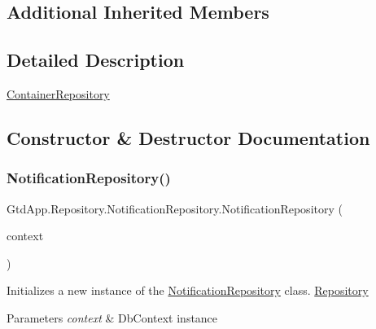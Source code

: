 \subsection*{Additional Inherited Members}


\subsection{Detailed Description}
\mbox{\hyperlink{class_gtd_app_1_1_repository_1_1_container_repository}{Container\+Repository}} 



\subsection{Constructor \& Destructor Documentation}
\mbox{\label{class_gtd_app_1_1_repository_1_1_notification_repository_a39cd06a390d0be8e1624dd4335e675ba}} 
\subsubsection{\texorpdfstring{Notification\+Repository()}{NotificationRepository()}}
{\footnotesize\ttfamily Gtd\+App.\+Repository.\+Notification\+Repository.\+Notification\+Repository (\begin{DoxyParamCaption}\item[{\mbox{\hyperlink{class_gtd_app_1_1_data_1_1_gtd_entity_data_model}{Gtd\+Entity\+Data\+Model}}}]{context }\end{DoxyParamCaption})}



Initializes a new instance of the \mbox{\hyperlink{class_gtd_app_1_1_repository_1_1_notification_repository}{Notification\+Repository}} class. \mbox{\hyperlink{class_gtd_app_1_1_repository_1_1_repository}{Repository}} 


\begin{DoxyParams}{Parameters}
{\em context} & Db\+Context instance\\
\hline
\end{DoxyParams}


